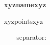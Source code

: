 \textbf{xyznamexyz}
\begin{itemize}[leftmargin=1.5em,itemsep=1pt,topsep=2pt]
xyzpointsxyz
\end{itemize}
-----
separator: \vspace{4pt}
